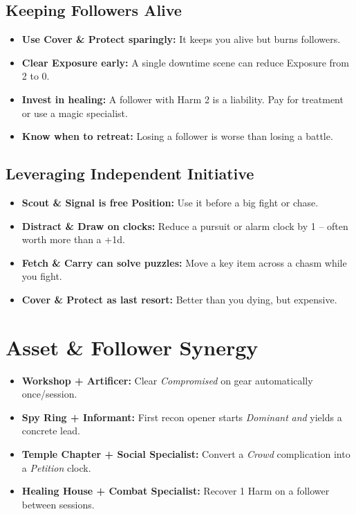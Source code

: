 \subsection*{Keeping Followers Alive}
\begin{itemize}
  \item \textbf{Use Cover \& Protect sparingly:} It keeps you alive but burns followers.
  \item \textbf{Clear Exposure early:} A single downtime scene can reduce Exposure from 2 to 0.
  \item \textbf{Invest in healing:} A follower with Harm 2 is a liability. Pay for treatment or use a magic specialist.
  \item \textbf{Know when to retreat:} Losing a follower is worse than losing a battle.
\end{itemize}

\subsection*{Leveraging Independent Initiative}
\begin{itemize}
  \item \textbf{Scout \& Signal is free Position:} Use it before a big fight or chase.
  \item \textbf{Distract \& Draw on clocks:} Reduce a pursuit or alarm clock by 1 -- often worth more than a +1d.
  \item \textbf{Fetch \& Carry can solve puzzles:} Move a key item across a chasm while you fight.
  \item \textbf{Cover \& Protect as last resort:} Better than you dying, but expensive.
\end{itemize}

\section{Asset \& Follower Synergy}
\begin{itemize}
  \item \textbf{Workshop + Artificer:} Clear \emph{Compromised} on gear automatically once/session.
  \item \textbf{Spy Ring + Informant:} First recon opener starts \emph{Dominant} \emph{and} yields a concrete lead.
  \item \textbf{Temple Chapter + Social Specialist:} Convert a \emph{Crowd} complication into a \emph{Petition} clock.
  \item \textbf{Healing House + Combat Specialist:} Recover 1 Harm on a follower between sessions.
\end{itemize}

